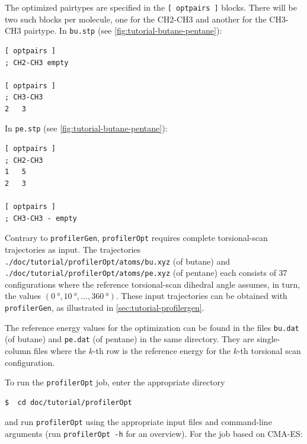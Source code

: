 \documentclass[10pt,a4paper,openany]{memoir}
\numberwithin{equation}{section}
\newcommand{\profileropt}[0]{\texttt{profilerOpt}}
\newcommand{\profilergen}[0]{\texttt{profilerGen}}
\begin{document}
The optimized pairtypes are specified in the \texttt{[~optpairs~]}
blocks. There will be two such blocks per molecule, one for the
CH2-CH3 and another for the CH3-CH3 pairtype.  In \texttt{bu.stp} (see
\autoref{fig:tutorial-butane-pentane}):

\begin{lstlisting}[language=gromacs]
[ optpairs ]
; CH2-CH3 empty

[ optpairs ]
; CH3-CH3
2   3
\end{lstlisting}\vspace{2ex}\par

\noindent In \texttt{pe.stp}
(see \autoref{fig:tutorial-butane-pentane}):

\begin{lstlisting}[language=gromacs]
[ optpairs ]
; CH2-CH3
1   5
2   3

[ optpairs ]
; CH3-CH3 - empty
\end{lstlisting}\vspace{2ex}\par


Contrary to \profilergen{}, \profileropt{} requires complete torsional-scan
trajectories as input. The trajectories
\texttt{./doc/tutorial/profilerOpt/atoms/bu.xyz} (of butane) and
\texttt{./doc/tutorial/profilerOpt/atoms/pe.xyz} (of pentane) each consists of
37 configurations where the reference torsional-scan dihedral angle assumes, in
turn, the values
$(\SI{0}{\degree}, \SI{10}{\degree}, \ldots, \SI{360}{\degree})$.  These input
trajectories can be obtained with \profilergen{}, as illustrated in
\autoref{sec:tutorial-profilergen}.

The reference energy values for the optimization can be found in the files
\texttt{bu.dat} (of butane) and \texttt{pe.dat} (of pentane) in the same
directory. They are single-column files where the $k$-th row is the
reference energy for the $k$-th torsional scan configuration.

To run the \profileropt{} job, enter the appropriate directory

\begin{lstlisting}[language=bash]
$  cd doc/tutorial/profilerOpt
\end{lstlisting}\vspace{2ex}\par

\noindent
and run \profileropt{} using the appropriate input files and
command-line arguments (run \texttt{profilerOpt -h} for an overview).
%
For the job based on CMA-ES:
\end{document}
